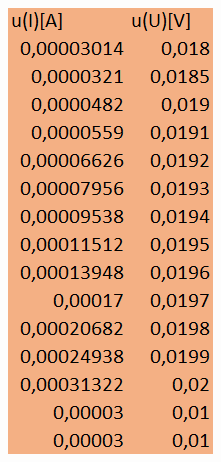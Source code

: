 \documentclass{article}
\begin{document}
\begin{figure}[b!]
  \centering
  \begin{subfigure}[b]{0.2\textwidth}
    \includegraphics[width=\linewidth]{Niepewnosci_Dioda_Czerwona.png}

\end{subfigure}
\end{figure}
\end{document}

